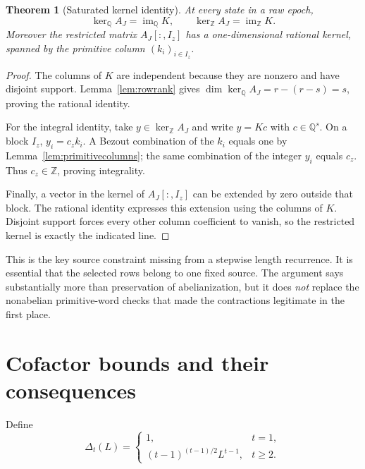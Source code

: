 \documentclass[11pt,letterpaper]{article}
\newtheorem{theorem}{Theorem}[section]
\theoremstyle{definition}
\theoremstyle{remark}\newtheorem{remark}[theorem]{Remark}
\newcommand{\Z}{\mathbb Z}\newcommand{\Q}{\mathbb Q}
\newcommand{\im}{\operatorname{im}}
\begin{document}
\begin{theorem}[Saturated kernel identity]
\label{thm:saturated}
At every state in a raw epoch,
\begin{equation}
 \ker_{\Q}A_J=\im_{\Q}K,
 \qquad
 \ker_{\Z}A_J=\im_{\Z}K.
 \label{eq:saturated}
\end{equation}
Moreover the restricted matrix $A_J[:,I_z]$ has a one-dimensional rational
kernel, spanned by the primitive column $(k_i)_{i\in I_z}$.
\end{theorem}
\begin{proof}
The columns of $K$ are independent because they are nonzero and have disjoint
support. Lemma~\ref{lem:rowrank} gives
$\dim\ker_{\Q}A_J=r-(r-s)=s$, proving the rational identity.

For the integral identity, take $y\in\ker_{\Z}A_J$ and write $y=Kc$ with
$c\in\Q^s$. On a block $I_z$, $y_i=c_zk_i$. A Bezout combination of the
$k_i$ equals one by Lemma~\ref{lem:primitivecolumns}; the same combination
of the integer $y_i$ equals $c_z$. Thus $c_z\in\Z$, proving integrality.

Finally, a vector in the kernel of $A_J[:,I_z]$ can be extended by zero
outside that block. The rational identity expresses this extension using
the columns of $K$. Disjoint support forces every other column coefficient
to vanish, so the restricted kernel is exactly the indicated line.
\end{proof}

This is the key source constraint missing from a stepwise length recurrence.
It is essential that the selected rows belong to one fixed source. The
argument says substantially more than preservation of abelianization, but
it does \emph{not} replace the nonabelian primitive-word checks that made
the contractions legitimate in the first place.

\section{Cofactor bounds and their consequences}
\label{sec:cofactor}

Define
\[
 \Delta_t(L)=
 \begin{cases}
 1,&t=1,\\
 (t-1)^{(t-1)/2}L^{t-1},&t\ge2.
 \end{cases}
\]
\end{document}
